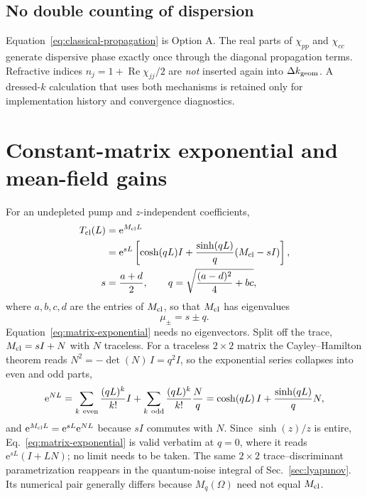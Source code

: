 \documentclass[11pt,a4paper]{article}
\newcommand{\e}{\mathrm e}
\newcommand{\Rea}{\operatorname{Re}}
\begin{document}
\subsection*{No double counting of dispersion}

Equation~\eqref{eq:classical-propagation} is Option A. The real parts of
$\chi_{pp}$ and $\chi_{cc}$ generate dispersive phase exactly once through the
diagonal propagation terms. Refractive indices
$n_j=1+\Rea\chi_{jj}/2$ are \emph{not} inserted again into
$\Delta k_{\rm geom}$. A dressed-$k$ calculation that uses both mechanisms is
retained only for implementation history and convergence diagnostics.

\section{Constant-matrix exponential and mean-field gains}
\label{sec:matrix-exponential}

For an undepleted pump and $z$-independent coefficients,
\begin{align}
T_{\rm cl}(L)&=\e^{M_{\rm cl}L}\nonumber\\
&=\e^{sL}\left[
\cosh(qL)I+\frac{\sinh(qL)}q(M_{\rm cl}-sI)\right],\\
s&=\frac{a+d}{2},\qquad
q=\sqrt{\frac{(a-d)^2}{4}+bc},
\label{eq:matrix-exponential}
\end{align}
where $a,b,c,d$ are the entries of $M_{\rm cl}$, so that $M_{\rm cl}$ has
eigenvalues
\begin{equation}
\mu_\pm=s\pm q .
\label{eq:Mcl-eigenvalues}
\end{equation}
Equation~\eqref{eq:matrix-exponential} needs no eigenvectors. Split off the
trace,
$M_{\rm cl}=sI+N$ with $N$ traceless. For a traceless $2\times2$ matrix the
Cayley--Hamilton theorem reads $N^2=-\det(N)\,I=q^2I$, so the exponential
series collapses into even and odd parts,
\begin{equation}
\e^{NL}=\sum_{k\ \rm even}\frac{(qL)^k}{k!}I
+\sum_{k\ \rm odd}\frac{(qL)^{k}}{k!}\frac{N}{q}
=\cosh(qL)\,I+\frac{\sinh(qL)}{q}N ,
\label{eq:cayley-hamilton}
\end{equation}
and $\e^{M_{\rm cl}L}=\e^{sL}\e^{NL}$ because $sI$ commutes with $N$. Since
$\sinh(z)/z$ is entire, Eq.~\eqref{eq:matrix-exponential} is valid verbatim
at $q=0$, where it reads $\e^{sL}(I+LN)$; no limit needs to be taken. The
same $2\times2$ trace--discriminant
parametrization reappears in the quantum-noise integral of
Sec.~\ref{sec:lyapunov}. Its numerical pair generally differs because
$M_q(\Omega)$ need not equal $M_{\rm cl}$.
\end{document}
